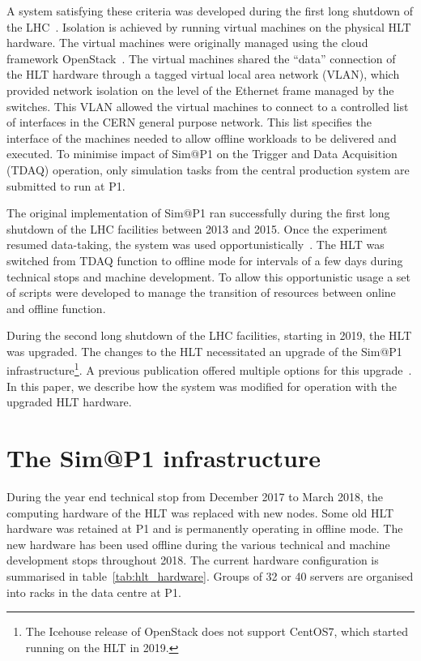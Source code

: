 \documentclass{webofc}
\begin{document}
A system satisfying these criteria was developed during the first long shutdown
of the LHC~\cite{Ballestrero:2015ypa}. Isolation is achieved by running virtual
machines on the physical HLT hardware. The virtual machines were originally
managed using the cloud framework OpenStack~\cite{openstack}. The virtual
machines shared the ``data'' connection of the HLT hardware through a tagged
virtual local area network (VLAN), which provided network isolation on the level
of the Ethernet frame managed by the switches. This VLAN allowed the virtual
machines to connect to a controlled list of interfaces in the CERN general
purpose network. This list specifies the interface of the machines needed to
allow offline workloads to be delivered and executed. To minimise impact of
Sim@P1 on the Trigger and Data Acquisition (TDAQ) operation, only simulation
tasks from the central production system are submitted to run at P1.

The original implementation of Sim@P1 ran successfully during the first long
shutdown of the LHC facilities between 2013 and 2015. Once the experiment
resumed data-taking, the system was used
opportunistically~\cite{Ballestrero:2017psv}. The HLT was switched from TDAQ
function to offline mode for intervals of a few days during technical stops and
machine development. To allow this opportunistic usage a set of scripts were
developed to manage the transition of resources between online and offline
function.

During the second long shutdown of the LHC facilities, starting in 2019, the HLT
was upgraded. The changes to the HLT necessitated an upgrade of the Sim@P1
infrastructure\footnote{The Icehouse release of OpenStack does not support
CentOS7, which started running on the HLT in 2019.}. A previous
publication offered multiple options for this upgrade~\cite{Berghaus:2019wuj}.
In this paper, we describe how the system was modified for operation with the
upgraded HLT hardware.

\section{The Sim@P1 infrastructure}
\label{sec:infra}
During the year end technical stop from December 2017 to March 2018, the
computing hardware of the HLT was replaced with new nodes. Some old HLT hardware
was retained at P1 and is permanently operating in offline mode. The new
hardware has been used offline during the various technical and machine
development stops throughout 2018. The current hardware configuration is
summarised in table~\ref{tab:hlt_hardware}. Groups of 32 or 40 servers are
organised into racks in the data centre at P1.
\end{document}
